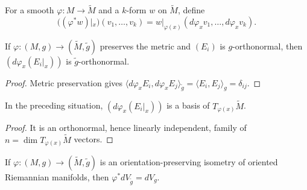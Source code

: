 \begin{definition}
\label{def:pullback-alternating}




For a smooth $\varphi:M\to\widetilde M$ and a $k$-form $w$ on $\widetilde M$, define
\[
((\varphi^*w)|_x)(v_1,\ldots,v_k)=w|_{\varphi(x)}(d\varphi_xv_1,\ldots,d\varphi_xv_k).
\]
\end{definition}

\begin{lemma}
\label{lem:orthonormal-pushforward}





If $\varphi:(M,g)\to(\widetilde M,\widetilde g)$ preserves the metric and $(E_i)$ is $g$-orthonormal, then $(d\varphi_x(E_i|_x))$ is $\widetilde g$-orthonormal.
\end{lemma}

\begin{proof}

\sketch Metric preservation gives $\langle d\varphi_xE_i,d\varphi_xE_j\rangle_{\widetilde g}=\langle E_i,E_j\rangle_g=\delta_{ij}$.
\end{proof}

\begin{lemma}
\label{lem:push-basis}





In the preceding situation, $(d\varphi_x(E_i|_x))$ is a basis of $T_{\varphi(x)}\widetilde M$.
\end{lemma}

\begin{proof}

\sketch It is an orthonormal, hence linearly independent, family of $n=\dim T_{\varphi(x)}\widetilde M$ vectors.
\end{proof}

\begin{proposition}\label{prop:isometry-preserves-volume-form}


If $\varphi:(M,g)\to(\widetilde M,\widetilde g)$ is an orientation-preserving
isometry of oriented Riemannian manifolds, then
$\varphi^*dV_{\widetilde g}=dV_g$.
\end{proposition}

